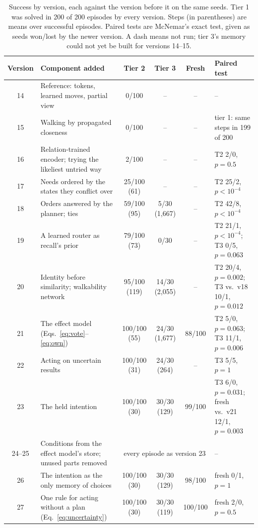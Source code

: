 \documentclass{article}
\begin{document}
\begin{table}[t]
    \caption{Success by version, each against the version before it on the same seeds. Tier 1 was solved in 200 of 200 episodes by every version. Steps (in parentheses) are means over successful episodes. Paired tests are McNemar's exact test, given as seeds won/lost by the newer version. A dash means not run; tier 3's memory could not yet be built for versions 14--15.}
    \centering
    \footnotesize
    \setlength{\tabcolsep}{4pt}
    \begin{tabular}{c >{\raggedright\arraybackslash}p{4.4cm} c c c >{\raggedright\arraybackslash}p{3.3cm}}
        \toprule
        Version & Component added & Tier 2 & Tier 3 & Fresh & Paired test \\
        \midrule
        14 & Reference: tokens, learned moves, partial view & 0/100 & -- & -- & -- \\
        15 & Walking by propagated closeness & 0/100 & -- & -- & tier 1: same steps in 199 of 200 \\
        16 & Relation-trained encoder; trying the likeliest untried way & 2/100 & -- & -- & T2 2/0, $p=0.5$ \\
        17 & Needs ordered by the states they conflict over & 25/100 (61) & -- & -- & T2 25/2, $p<10^{-4}$ \\
        18 & Orders answered by the planner; ties & 59/100 (95) & 5/30 (1,667) & -- & T2 42/8, $p<10^{-4}$ \\
        19 & A learned router as recall's prior & 79/100 (73) & 0/30 & -- & T2 21/1, $p<10^{-4}$; T3 0/5, $p=0.063$ \\
        20 & Identity before similarity; walkability network & 95/100 (119) & 14/30 (2,055) & -- & T2 20/4, $p=0.002$; T3 vs.\ v18 10/1, $p=0.012$ \\
        21 & The effect model (Eqs.~\ref{eq:vote}--\ref{eq:own}) & 100/100 (55) & 24/30 (1,677) & 88/100 & T2 5/0, $p=0.063$; T3 11/1, $p=0.006$ \\
        22 & Acting on uncertain results & 100/100 (31) & 24/30 (264) & -- & T3 5/5, $p=1$ \\
        23 & The held intention & 100/100 (30) & 30/30 (129) & 99/100 & T3 6/0, $p=0.031$; fresh vs.\ v21 12/1, $p=0.003$ \\
        24--25 & Conditions from the effect model's store; unused parts removed & \multicolumn{3}{c}{every episode as version 23} & -- \\
        26 & The intention as the only memory of choices & 100/100 (30) & 30/30 (129) & 98/100 & fresh 0/1, $p=1$ \\
        27 & One rule for acting without a plan (Eq.~\ref{eq:uncertainty}) & 100/100 (30) & 30/30 (119) & 100/100 & fresh 2/0, $p=0.5$ \\
        \bottomrule
    \end{tabular}
    \label{tab:versions}
\end{table}
\end{document}
